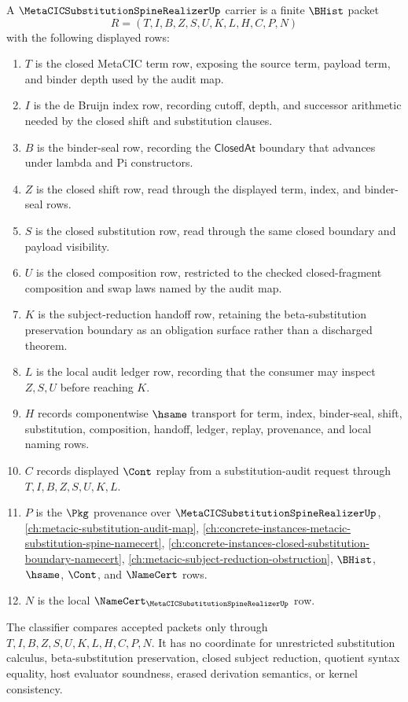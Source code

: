 \begin{definition}
\label{def:metacic-substitution-spine-realizer-carrier}
A $\MetaCICSubstitutionSpineRealizerUp$ carrier is a finite $\BHist$ packet
$$
R=(T,I,B,Z,S,U,K,L,H,C,P,N)
$$
with the following displayed rows:
\begin{enumerate}
\item $T$ is the closed MetaCIC term row, exposing the source term, payload term, and binder depth used by the audit map.
\item $I$ is the de Bruijn index row, recording cutoff, depth, and successor arithmetic needed by the closed shift and substitution clauses.
\item $B$ is the binder-seal row, recording the $\mathsf{ClosedAt}$ boundary that advances under lambda and Pi constructors.
\item $Z$ is the closed shift row, read through the displayed term, index, and binder-seal rows.
\item $S$ is the closed substitution row, read through the same closed boundary and payload visibility.
\item $U$ is the closed composition row, restricted to the checked closed-fragment composition and swap laws named by the audit map.
\item $K$ is the subject-reduction handoff row, retaining the beta-substitution preservation boundary as an obligation surface rather than a discharged theorem.
\item $L$ is the local audit ledger row, recording that the consumer may inspect $Z,S,U$ before reaching $K$.
\item $H$ records componentwise $\hsame$ transport for term, index, binder-seal, shift, substitution, composition, handoff, ledger, replay, provenance, and local naming rows.
\item $C$ records displayed $\Cont$ replay from a substitution-audit request through $T,I,B,Z,S,U,K,L$.
\item $P$ is the $\Pkg$ provenance over $\MetaCICSubstitutionSpineRealizerUp$, \autoref{ch:metacic-substitution-audit-map}, \autoref{ch:concrete-instances-metacic-substitution-spine-namecert}, \autoref{ch:concrete-instances-closed-substitution-boundary-namecert}, \autoref{ch:metacic-subject-reduction-obstruction}, $\BHist$, $\hsame$, $\Cont$, and $\NameCert$ rows.
\item $N$ is the local $\NameCert_{\MetaCICSubstitutionSpineRealizerUp}$ row.
\end{enumerate}
The classifier compares accepted packets only through $T,I,B,Z,S,U,K,L,H,C,P,N$. It has no coordinate for unrestricted substitution calculus, beta-substitution preservation, closed subject reduction, quotient syntax equality, host evaluator soundness, erased derivation semantics, or kernel consistency.
\end{definition}

